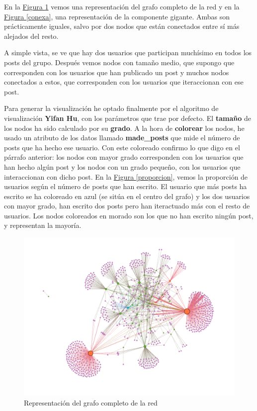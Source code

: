 \documentclass[10pt,a4paper,spanish]{article}
\numberwithin{equation}{section} %
\numberwithin{figure}{section} %
\numberwithin{table}{section} %
\begin{document}
En la \hyperref[completo]{Figura \ref*{completo}} vemos una representación del grafo completo de la red y en la \hyperref[conexa]{Figura \ref*{conexa}}, una representación de la componente gigante. Ambas son prácticamente iguales, salvo por dos nodos que están conectados entre sí más alejados del resto. 

A simple vista, se ve que hay dos usuarios que participan muchísimo en todos los posts del grupo. Después vemos nodos con tamaño medio, que supongo que corresponden con los usuarios que han publicado un post y muchos nodos conectados a estos, que corresponden con los usuarios que iteraccionan con ese post.

Para generar la visualización he optado finalmente por el algoritmo de visualización \textbf{Yifan Hu}, con los parámetros que trae por defecto. El \textbf{tamaño} de los nodos ha sido calculado por su \textbf{grado}. A la hora de \textbf{colorear} los nodos, he usado un atributo de los datos llamado \textbf{made\_posts} que mide el número de posts que ha hecho ese usuario. Con este coloreado confirmo lo que digo en el párrafo anterior: los nodos con mayor grado corresponden con los usuarios que han hecho algún post y los nodos con un grado pequeño, con los usuarios que interaccionan con dicho post. En la \hyperref[proporcion]{Figura \ref*{proporcion}}, vemos la proporción de usuarios según el número de posts que han escrito. El usuario que más posts ha escrito se ha coloreado en azul (se sitúa en el centro del grafo) y los dos usuarios con mayor grado, han escrito dos posts pero han iteractuado más con el resto de usuarios. Los nodos coloreados en morado son los que no han escrito ningún post, y representan la mayoría.

\begin{figure}[!h]
    \centering
    \includegraphics[width=\textwidth]{1}
    \caption{Representación del grafo completo de la red}
    \label{completo}
\end{figure}
\end{document}
